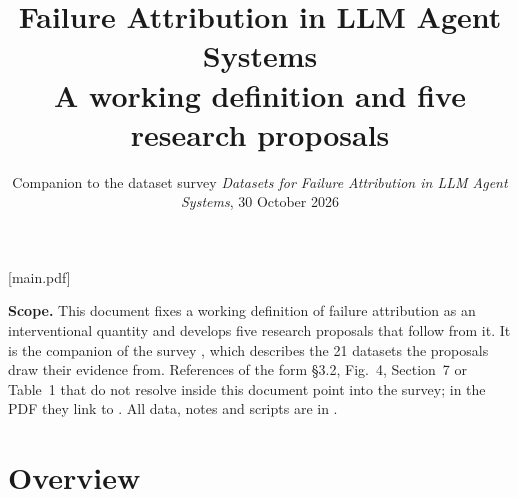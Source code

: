 \def\loadxrhyper{}          %

[main.pdf]   %
\title{\vspace{-9mm}\LARGE Failure Attribution in LLM Agent Systems\\[3pt]\large A working definition and five research proposals}
\author{\normalsize Companion to the dataset survey \emph{Datasets for Failure Attribution in LLM Agent Systems}, 30 October 2026}\date{}

\maketitle\vspace{-7mm}
\begin{tcolorbox}[enhanced,colback=surface,colframe=rule,boxrule=0.3pt,arc=1.5pt,left=5pt,right=5pt,top=3pt,bottom=3pt,fontupper=\small]
\textbf{Scope.} This document fixes a working definition of failure attribution as an interventional quantity and develops five research proposals that follow from it. It is the companion of the survey , which describes the 21 datasets the proposals draw their evidence from. References of the form \S3.2, Fig.~4, Section~7 or Table~1 that do not resolve inside this document point into the survey; in the PDF they link to . All data, notes and scripts are in .
\end{tcolorbox}
\vspace{-2pt}\tableofcontents

\section{Overview}\label{sec:future}

